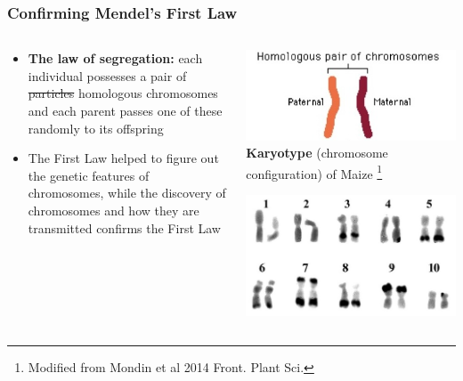 \documentclass{beamer}
\newcommand\blfootnote[1]{%
	\begingroup
	\renewcommand\thefootnote{}\footnote{#1}%
	\addtocounter{footnote}{-1}%
	\endgroup
}
\begin{document}
\begin{frame}
	\frametitle{Confirming Mendel's First Law}
	
	\begin{columns}
		
		\begin{column}{0.5\textwidth}
			\begin{itemize}

\small 
\item[]	\textbf{The law of segregation: } each individual possesses a pair of \st{particles}  homologous chromosomes and each parent passes one of these randomly to its offspring\\
\vspace{20pt}

\item[] The First Law helped to figure out the genetic features of chromosomes, while the discovery of chromosomes and how they are transmitted confirms the First Law 
				
			\end{itemize}
		\end{column}
		\begin{column}{0.5\textwidth}
			\includegraphics[keepaspectratio, width  =\textwidth]{img/homologousChroms}
			\vspace{10pt}\\
			
			\tiny	\textbf{Karyotype} (chromosome configuration) of Maize	\blfootnote{Modified from Mondin et al 2014 Front. Plant Sci.}
			\includegraphics[keepaspectratio, width  =\textwidth]{img/maizeKaryotype}
			
			
		\end{column}
	\end{columns}
	
\end{frame}
\end{document}
